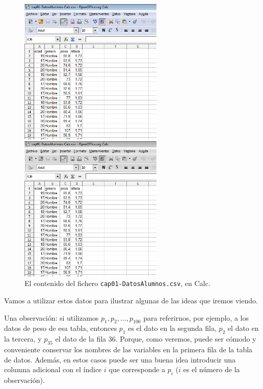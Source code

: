    \begin{figure}[h]
	\begin{center}
	\begin{enColor}
	\includegraphics[height=7cm]{../fig/Cap01-DatosAlumnos.png}
	\end{enColor}
	\begin{bn}
	\includegraphics[height=7cm]{../fig/Cap01-DatosAlumnos-bn.png}
	\end{bn}
	\caption{El contenido del fichero {\tt cap01-DatosAlumnos.csv}, en Calc.}
	\label{cap01:fig:DatosAlumnosCalc}
    \end{center}
    \end{figure}


Vamos a utilizar estos datos para ilustrar algunas de las ideas que iremos viendo.

Una observación: si utilizamos $p_1,p_2,\ldots,p_{100}$ para referirnos, por ejemplo, a los datos de peso de esa tabla,
entonces $p_1$ es el dato en la segunda fila, $p_2$ el dato en la tercera, y
$p_{35}$ el dato de la fila $36$. Porque, como veremos, puede ser
cómodo y conveniente conservar los nombres de las variables en la primera fila
de la tabla de datos. Además, en estos casos puede ser una buena idea
introducir una columna adicional con el índice $i$ que corresponde a $p_i$ ($i$
es el número de la observación).

